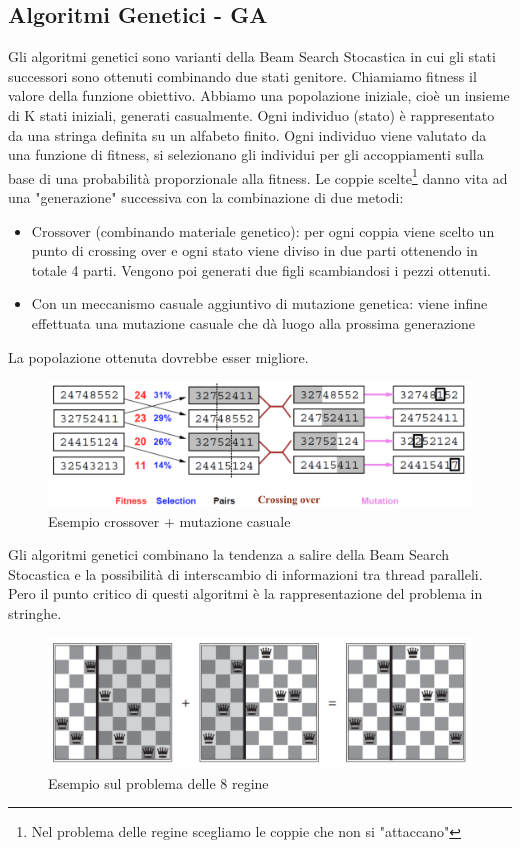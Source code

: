 \documentclass{article}
\begin{document}
\subsection{Algoritmi Genetici - GA}
Gli algoritmi genetici sono varianti della Beam Search Stocastica in cui gli stati successori sono ottenuti combinando due stati genitore. Chiamiamo fitness il valore della funzione obiettivo. \newline
Abbiamo una popolazione iniziale, cioè un insieme di K stati iniziali, generati casualmente. Ogni individuo (stato) è rappresentato da una stringa definita su un alfabeto finito. Ogni individuo viene valutato da una funzione di fitness, si selezionano gli individui per gli accoppiamenti sulla base di una probabilità proporzionale alla fitness. Le coppie scelte\footnote{Nel problema delle regine scegliamo le coppie che non si "attaccano"} danno vita ad una "generazione" successiva con la combinazione di due metodi:
\begin{itemize}
    \item Crossover (combinando materiale genetico): per ogni coppia viene scelto un punto di crossing over e ogni stato viene diviso in due parti ottenendo in totale 4 parti. Vengono poi generati due figli scambiandosi i pezzi ottenuti.
    \item Con un meccanismo casuale aggiuntivo di mutazione genetica: viene infine effettuata una mutazione casuale che dà luogo alla prossima generazione
\end{itemize}
La popolazione ottenuta dovrebbe esser migliore.
\begin{figure}[H]
    \centering
    \includegraphics[scale=0.5]{Images/alggeneticicross.png}
    \caption{Esempio crossover + mutazione casuale}
\end{figure}
Gli algoritmi genetici combinano la tendenza a salire della Beam Search Stocastica e la possibilità di interscambio di informazioni tra thread paralleli. Pero il punto critico di questi algoritmi è la rappresentazione del problema in stringhe.
\begin{figure}[H]
    \centering
    \includegraphics[scale=0.5]{Images/alggenscacchi.png}
    \caption{Esempio sul problema delle 8 regine}
\end{figure}
\end{document}
